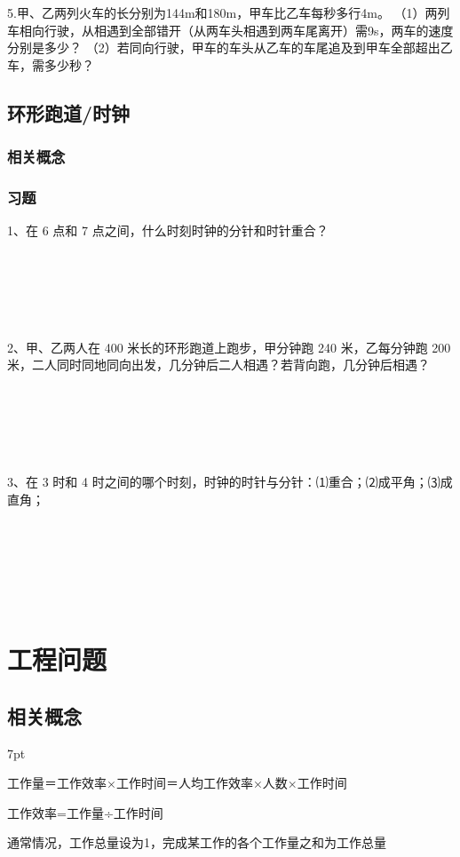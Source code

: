 \documentclass{article}
\newenvironment{wa}{%
\def\FrameCommand{%
\hspace{1pt}%
{\color{LightCoral}\vrule width 2pt}%
{\color{washade}\vrule width 4pt}%
\colorbox{washade}%
}%
\MakeFramed{\advance\hsize-\width\FrameRestore}%
\noindent\hspace{-4.55pt}%
\begin{adjustwidth}{}{7pt}%
\vspace{2pt}\vspace{2pt}%
\normalfont %
}
{%
\vspace{2pt}\end{adjustwidth}\endMakeFramed%
}
\begin{document}
~\\
~\\
~\\
~\\
~\\
5.甲、乙两列火车的长分别为144m和180m，甲车比乙车每秒多行4m。
（1）两列车相向行驶，从相遇到全部错开（从两车头相遇到两车尾离开）需9s，两车的速度分别是多少？
（2）若同向行驶，甲车的车头从乙车的车尾追及到甲车全部超出乙车，需多少秒？

\subsection{环形跑道/时钟}
\subsubsection*{相关概念}
\subsubsection*{习题}
1、在 6 点和 7 点之间，什么时刻时钟的分针和时针重合？

~\\
~\\
~\\
~\\
~\\
2、甲、乙两人在 400 米长的环形跑道上跑步，甲分钟跑 240 米，乙每分钟跑 200 米，二人同时同地同向出发，几分钟后二人相遇？若背向跑，几分钟后相遇？

~\\
~\\
~\\
~\\
~\\
3、在 3 时和 4 时之间的哪个时刻，时钟的时针与分针：⑴重合；⑵成平角；⑶成直角；

~\\
~\\
~\\
~\\
~\\ 

\newpage
\section{工程问题}
\subsection{相关概念}
\begin{wa}
 \quad \quad   工作量＝工作效率×工作时间＝人均工作效率×人数×工作时间

    工作效率=工作量÷工作时间

\end{wa}   
通常情况，工作总量设为1，完成某工作的各个工作量之和为工作总量
\end{document}
